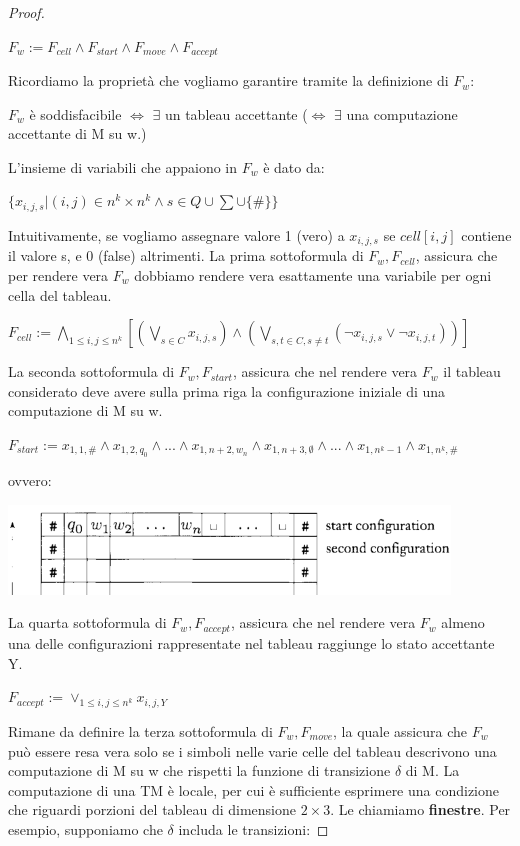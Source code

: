 \documentclass[a4paper, 12pt]{article}
\begin{document}
\begin{proof}
\begin{center}
$F_w := F_{cell} \land F_{start} \land F_{move} \land F_{accept}$
\end{center}
Ricordiamo la propriet\`a che vogliamo garantire tramite la definizione di $F_w$:
\begin{center}
$F_w$ \`e soddisfacibile $\iff$ $\exists$ un tableau accettante ($\iff$ $\exists$ una computazione accettante di M su w.)
\end{center}
L'insieme di variabili che appaiono in $F_w$ \`e dato da:
\begin{center}
$\{x_{i,j,s} | (i,j) \in n^k \times n^k \land s \in Q \cup \sum \cup \{\#\}\}$
\end{center}
Intuitivamente, se vogliamo assegnare valore 1 (vero) a $x_{i,j,s}$ se $cell[i,j]$ contiene il valore s, e 0 (false) altrimenti.
La prima sottoformula di $F_w, F_{cell}$, assicura che per rendere vera $F_w$ dobbiamo rendere vera esattamente una variabile per ogni cella del tableau.
\begin{center}
$F_{cell} := \bigwedge_{1\leq i, j\leq n^{k}} [(\bigvee_{s \in C}x_{i,j,s}) \land (\bigvee_{s,t \in C, s \neq t} (\neg x_{i,j,s} \lor \neg x_{i,j,t}))]$
\end{center}
La seconda sottoformula di $F_w, F_{start}$, assicura che nel rendere vera $F_w$ il tableau considerato deve avere sulla prima riga la configurazione iniziale di una computazione di M su w.
\begin{center}
$F_{start} := x_{1,1,\#} \land x_{1,2,q_0} \land ... \land x_{1,n+2,w_n} \land x_{1,n+3, \emptyset} \land ... \land x_{1,n^{k}-1} \land x_{1,n^{k},\#}$
\end{center}
ovvero:
\begin{center}
\includegraphics[scale=0.5]{tableau2.png}
\end{center}
La quarta sottoformula di $F_w, F_{accept}$, assicura che nel rendere vera $F_w$ almeno una delle configurazioni rappresentate nel tableau raggiunge lo stato accettante Y.
\begin{center}
$F_{accept} := \lor_{1\leq i,j\leq n^{k}} x_{i,j,Y}$
\end{center}
Rimane da definire la terza sottoformula di $F_w, F_{move}$, la quale assicura che $F_w$ pu\`o essere resa vera solo se i simboli nelle varie celle del tableau descrivono una computazione di M su w che rispetti la funzione di transizione $\delta$ di M. La computazione di una TM \`e locale, per cui \`e sufficiente esprimere una condizione che riguardi porzioni del tableau di dimensione $2 \times 3$. Le chiamiamo \textbf{finestre}. Per esempio, supponiamo che $\delta$ includa le transizioni:

\end{proof}
\end{document}
